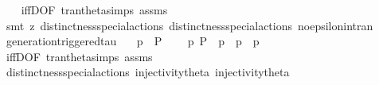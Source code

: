 \begin{isabellebody}
%
\isadelimproof
\ \ %
\endisadelimproof
%
\isatagproof
{}\isamarkupfalse%
\ iffD{}{\isacharbrackleft}{\kern0pt}OF\ tran{\isacharunderscore}{\kern0pt}theta{\isachardot}{\kern0pt}simps\ assms{\isacharparenleft}{\kern0pt}{}{\isacharparenright}{\kern0pt}{\isacharbrackright}{\kern0pt}\ \isanewline
\ \ \isamarkupfalse%
\ {\isacharparenleft}{\kern0pt}smt\ {\isacharparenleft}{\kern0pt}z{}{\isacharparenright}{\kern0pt}\ distinctness{\isacharunderscore}{\kern0pt}special{\isacharunderscore}{\kern0pt}actions{\isacharparenleft}{\kern0pt}{}{\isacharparenright}{\kern0pt}\ distinctness{\isacharunderscore}{\kern0pt}special{\isacharunderscore}{\kern0pt}actions{\isacharparenleft}{\kern0pt}{}{\isacharparenright}{\kern0pt}\ no{\isacharunderscore}{\kern0pt}epsilon{\isacharunderscore}{\kern0pt}in{\isacharunderscore}{\kern0pt}tran{\isacharparenleft}{\kern0pt}{}{\isacharparenright}{\kern0pt}{\isacharparenright}{\kern0pt}%
\endisatagproof
{\isafoldproof}%
%
\isadelimproof
\isanewline
%
\endisadelimproof
\isanewline
{}\isamarkupfalse%
\ generation{\isacharunderscore}{\kern0pt}triggered{\isacharunderscore}{\kern0pt}tau{\isacharcolon}{\kern0pt}\isanewline
\ \ \ {\isacartoucheopen}{\isasymtheta}{\isacharparenleft}{\kern0pt}p{\isacharparenright}{\kern0pt}\ {\isasymlongmapsto}\isactrlsup {\isasymtheta}{\isasymtau}\ P{\isacharprime}{\kern0pt}{\isacartoucheclose}\isanewline
\ \ \ {\isacartoucheopen}{\isasymexists}\ p{\isacharprime}{\kern0pt}{\isachardot}{\kern0pt}\ P{\isacharprime}{\kern0pt}\ {\isacharequal}{\kern0pt}\ {\isasymtheta}{\isacharparenleft}{\kern0pt}p{\isacharprime}{\kern0pt}{\isacharparenright}{\kern0pt}\ {\isasymand}\ p\ {\isasymlongmapsto}{\isasymtau}\ p{\isacharprime}{\kern0pt}{\isacartoucheclose}\isanewline
%
\isadelimproof
\ \ %
\endisadelimproof
%
\isatagproof
{}\isamarkupfalse%
\ iffD{}{\isacharbrackleft}{\kern0pt}OF\ tran{\isacharunderscore}{\kern0pt}theta{\isachardot}{\kern0pt}simps\ assms{\isacharbrackright}{\kern0pt}\isanewline
\ \ \isamarkupfalse%
\ distinctness{\isacharunderscore}{\kern0pt}special{\isacharunderscore}{\kern0pt}actions{\isacharparenleft}{\kern0pt}{}{\isacharparenright}{\kern0pt}\ injectivity{\isacharunderscore}{\kern0pt}theta{\isacharparenleft}{\kern0pt}{}{\isacharparenright}{\kern0pt}\ injectivity{\isacharunderscore}{\kern0pt}theta{\isacharparenleft}{\kern0pt}{}{\isacharparenright}{\kern0pt}\ \isamarkupfalse%

\end{isabellebody}
